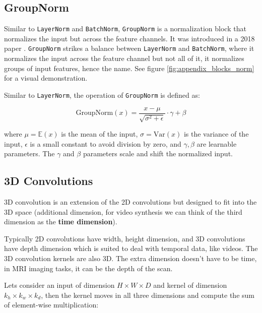 \subsection*{GroupNorm}

Similar to \texttt{LayerNorm} and \texttt{BatchNorm}, \texttt{GroupNorm} is a normalization block that normalizes the input but across the feature channels. It was introduced in a 2018 paper \cite{wu2018group}. \texttt{GroupNorm} strikes a balance between \texttt{LayerNorm} and \texttt{BatchNorm}, where it normalizes the input across the feature channel but not all of it, it normalizes groups of input features, hence the name. See figure \ref{fig:appendix_blocks_norm} for a visual demonstration.

Similar to \texttt{LayerNorm}, the operation of \texttt{GroupNorm} is defined as:

\begin{equation*}
    \text{GroupNorm}(x) = \frac{x - \mu}{\sqrt{\sigma^2 + \epsilon}} \cdot \gamma + \beta
\end{equation*}

where $\mu = \mathbb{E}(x)$ is the mean of the input, $\sigma = \text{Var} (x)$ is the variance of the input, $\epsilon$ is a small constant to avoid division by zero, and $\gamma, \beta$ are learnable parameters. The $\gamma$ and $\beta$ parameters scale and shift the normalized input.










\subsection{3D Convolutions}
\label{appendix:blocks_3dconv}

3D convolution is an extension of the 2D convolutions but designed to fit into the 3D space (additional dimension, for video synthesis we can think of the third dimension as the \textbf{time dimension}).

Typically 2D convolutions have width, height dimension, and 3D convolutions have depth dimension which is suited to deal with temporal data, like videos. The 3D convolution kernels are also 3D. The extra dimension doesn't have to be time, in MRI imaging tasks, it can be the depth of the scan.

Lets consider an input of dimension $H \times W \times D$ and kernel of dimension $k_h \times k_w \times k_d$, then the kernel moves in all three dimensions and compute the sum of element-wise multiplication:

